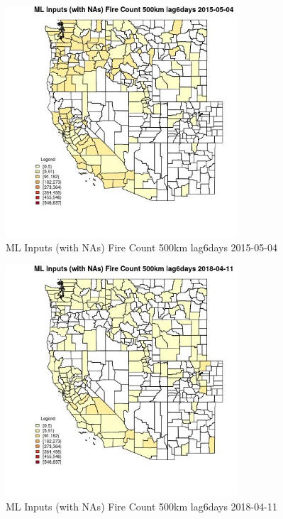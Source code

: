 \begin{figure} 
\centering  
\includegraphics[width=0.77\textwidth]{Code_Outputs/Report_ML_input_PM25_Step4_part_e_de_duplicated_aves_compiled_2019-05-18wNAs_CountyFire_Count_500km_lag6daysMean2015-05-04.jpg} 
\caption{\label{fig:Report_ML_input_PM25_Step4_part_e_de_duplicated_aves_compiled_2019-05-18wNAsCountyFire_Count_500km_lag6daysMean2015-05-04}ML Inputs (with NAs) Fire Count 500km lag6days 2015-05-04} 
\end{figure} 
 

\begin{figure} 
\centering  
\includegraphics[width=0.77\textwidth]{Code_Outputs/Report_ML_input_PM25_Step4_part_e_de_duplicated_aves_compiled_2019-05-18wNAs_CountyFire_Count_500km_lag6daysMean2018-04-11.jpg} 
\caption{\label{fig:Report_ML_input_PM25_Step4_part_e_de_duplicated_aves_compiled_2019-05-18wNAsCountyFire_Count_500km_lag6daysMean2018-04-11}ML Inputs (with NAs) Fire Count 500km lag6days 2018-04-11} 
\end{figure} 
 

